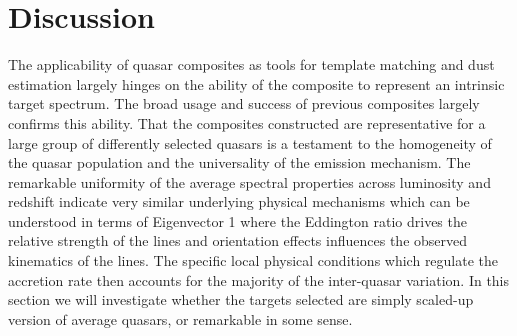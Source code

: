 \documentclass{aa}    %
\newcommand{\sectlabel}[1]{\label{sect:#1}}
\newcommand{\todo}[3]{{\color{#2}\emph{#1}: #3}}
\newcommand{\jstodo}[1]{\todo{TODO }{green}{#1}}
\newcommand{\qtodo}[1]{\todo{Question}{red}{#1}}
\begin{document}
\section{Discussion}  \sectlabel{discuss}

The applicability of quasar composites as tools for template matching and dust estimation largely hinges on the ability of the composite to represent an intrinsic target spectrum. The broad usage and success of previous composites largely confirms this ability. That the composites constructed are representative for a large group of differently selected quasars is a testament to the homogeneity of the quasar population and the universality of the emission mechanism.
The remarkable uniformity of the average spectral properties across luminosity and redshift indicate very similar underlying physical mechanisms which can be understood in terms of Eigenvector 1\citep{Boroson1992, Francis1992} where the Eddington ratio drives the relative strength of the lines and orientation effects influences the observed kinematics of the lines\citep{Shen2014a}. The specific local physical conditions which regulate the accretion rate then accounts for the majority of the inter-quasar variation. In this section we will investigate whether the targets selected are simply scaled-up version of average quasars, or remarkable in some sense.


%
%
\end{document}
